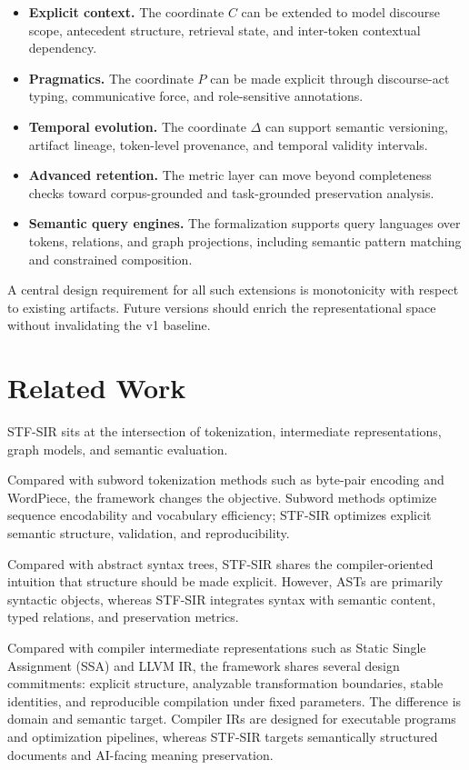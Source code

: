 \documentclass{article}
\newcommand{\STF}{{\normalfont\textsc{STF}}}
\newcommand{\SIR}{{\normalfont\textsc{SIR}}}
\begin{document}
\begin{itemize}
\item \textbf{Explicit context.} The coordinate \(C\) can be extended to model discourse scope, antecedent structure, retrieval state, and inter-token contextual dependency.
\item \textbf{Pragmatics.} The coordinate \(P\) can be made explicit through discourse-act typing, communicative force, and role-sensitive annotations.
\item \textbf{Temporal evolution.} The coordinate \(\Delta\) can support semantic versioning, artifact lineage, token-level provenance, and temporal validity intervals.
\item \textbf{Advanced retention.} The metric layer can move beyond completeness checks toward corpus-grounded and task-grounded preservation analysis.
\item \textbf{Semantic query engines.} The formalization supports query languages over tokens, relations, and graph projections, including semantic pattern matching and constrained composition.
\end{itemize}

A central design requirement for all such extensions is monotonicity with respect to existing artifacts. Future versions should enrich the representational space without invalidating the v1 baseline.

\section{Related Work}

\STF{}-\SIR{} sits at the intersection of tokenization, intermediate representations, graph models, and semantic evaluation.

Compared with subword tokenization methods such as byte-pair encoding and WordPiece, the framework changes the objective. Subword methods optimize sequence encodability and vocabulary efficiency; \STF{}-\SIR{} optimizes explicit semantic structure, validation, and reproducibility.

Compared with abstract syntax trees, \STF{}-\SIR{} shares the compiler-oriented intuition that structure should be made explicit. However, ASTs are primarily syntactic objects, whereas \STF{}-\SIR{} integrates syntax with semantic content, typed relations, and preservation metrics.

Compared with compiler intermediate representations such as Static Single Assignment (SSA) and LLVM IR, the framework shares several design commitments: explicit structure, analyzable transformation boundaries, stable identities, and reproducible compilation under fixed parameters. The difference is domain and semantic target. Compiler IRs are designed for executable programs and optimization pipelines, whereas \STF{}-\SIR{} targets semantically structured documents and AI-facing meaning preservation.
\end{document}
